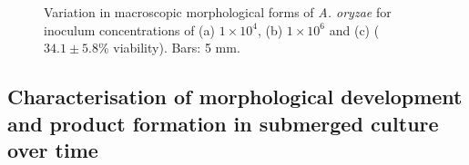 \begin{figure}[tb]
	\centering
	\hspace{0.5cm}
	\hspace{0.5cm}
	\caption{Variation in macroscopic morphological forms of \emph{A. oryzae} for inoculum concentrations of (a) $1 \times 10^4$, (b) $1 \times 10^6$ and (c)  ($34.1 \pm 5.8$\% viability). Bars: 5 mm. }
	\label{fig:QualInoc}
\end{figure}

\subsection{Characterisation of morphological development and product formation in submerged culture over time}

